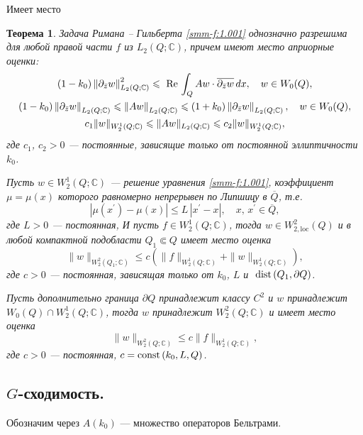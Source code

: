 \documentclass[a4paper,12pt]{article}
\newtheorem{theorem}{Теорема}[section]
\theoremstyle{definition}
\begin{document}
Имеет место


\begin{theorem}\label{smm-th1.1}
Задача Римана -- Гильберта { \eqref{smm-f:1.001}} однозначно разрешима для любой правой части $f$ из $L_2(Q;\mathbb{C})$,
причем имеют место априорные оценки:
\begin{gather*}
(1-k_0)\left\|\partial_{\bar{z}}w\right\|^2_{L_2(Q;\mathbb{C})}\leqslant \text{ Re\,} \int_{Q} Aw\cdot \overline{\partial_{\bar{z}}w}\,dx,\quad w\in W_0(Q),\\
(1-k_0)\left\|\partial_{\bar{z}}w\right\|_{L_2(Q;\mathbb{C})}\leqslant \left\| Aw\right\|_{L_2(Q;\mathbb{C})} \leqslant
(1+k_0)\left\|\partial_{\bar{z}}w\right\|_{L_2(Q;\mathbb{C})}, \quad w\in W_0(Q),\\
	c_1\|w\|_{W^1_2(Q;\mathbb{C})}\leqslant\|Aw\|_{L_2(Q;\mathbb{C})}\leqslant c_2 \|w\|_{W^1_2(Q;\mathbb{C})},
\end{gather*}
где $c_1$, $c_2>0$ --- постоянные, зависящие только от постоянной эллиптичности $k_0$.


\hspace{5.mm} Пусть $w\in W_2^1(Q;\mathbb{C})$ --- решение уравнения  { \eqref{smm-f:1.001}}, коэффициент $\mu=\mu(x)$ которого равномерно непрерывен по Липшицу в $\overline Q$, т.е.
$$
|\mu(x^\prime)-\mu(x)|\leqslant L\,|x^\prime-x|,\quad x,\,x^\prime\in \overline{Q},
$$
где $L>0$ --- постоянная, И пусть  $f\in W_2^1(Q;\mathbb{C})$, тогда $w\in W_{2,\text{loc}}^2(Q)$ и в любой компактной подобласти $Q_1\Subset Q$ имеет место оценка
\begin{equation*}
	\|w\|_{W^2_2(Q_1; \mathbb{C})}\leqslant c\left(\|f\|_{W^1_2(Q; \mathbb{C})}+\|w\|_{W^1_2(Q; \mathbb{C})}\right),
\end{equation*}
где $c>0$ --- постоянная, зависящая только от $k_0$, $L$ и $\text{ dist\,}(Q_1,\partial Q)$.

\hspace{5.mm} Пусть дополнительно граница $\partial Q$ принадлежит классу $C^2$ и $w$ принадлежит $W_0(Q)\cap W_2^1(Q; \mathbb{C})$, тогда $w$ принадлежит $W_2^2(Q; \mathbb{C})$ и имеет место оценка
\begin{equation*}
\|w\|_{W^2_2(Q; \mathbb{C})}\leqslant c\|f\|_{W^1_2(Q; \mathbb{C})},
\end{equation*}
где $c>0$ --- постоянная, $c=\text{const\,}(k_0, L, Q)$.
\end{theorem}





\subsection{$G$-сходимость.}
Обозначим через $A(k_0)$ --- множество операторов Бельтрами.
\end{document}
